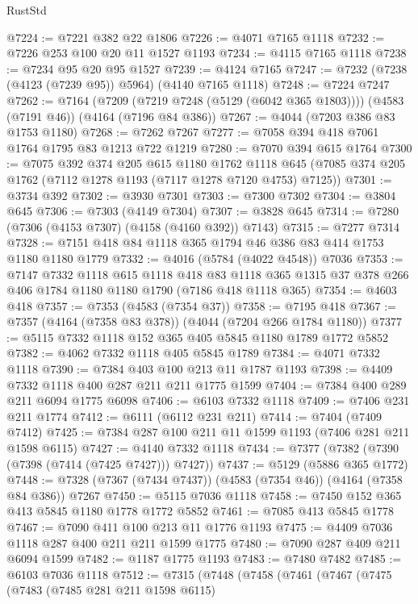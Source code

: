 \begin{lexlean}{RustStd}
\begin{coremodule}
@7224 := @7221 @382 @22 @1806
@7226 := @4071 @7165 @1118
@7232 := @7226 @253 @100 @20 @11 @1527 @1193
@7234 := @4115 @7165 @1118
@7238 := @7234 @95 @20 @95 @1527
@7239 := @4124 @7165
@7247 := @7232 (@7238 (@4123 (@7239 @95)) @5964) (@4140 @7165 @1118)
@7248 := @7224 @7247
@7262 := @7164
    (@7209 (@7219 @7248 (@5129 (@6042 @365 @1803))))
    (@4583 (@7191 @46))
    (@4164 (@7196 @84 @386))
@7267 := @4044 (@7203 @386 @83 @1753 @1180)
@7268 := @7262 @7267
@7277 := @7058 @394 @418 @7061 @1764 @1795 @83 @1213 @722 @1219
@7280 := @7070 @394 @615 @1764
@7300 := @7075
    @392
    @374
    @205
    @615
    @1180
    @1762
    @1118
    @645
    (@7085 @374 @205 @1762 (@7112 @1278 @1193 (@7117 @1278 @7120 @4753) @7125))
@7301 := @3734 @392
@7302 := @3930 @7301
@7303 := @7300 @7302
@7304 := @3804 @645
@7306 := @7303 (@4149 @7304)
@7307 := @3828 @645
@7314 := @7280 (@7306 (@4153 @7307) (@4158 (@4160 @392)) @7143)
@7315 := @7277 @7314
@7328 := @7151 @418 @84 @1118 @365 @1794 @46 @386 @83 @414 @1753 @1180 @1180 @1779
@7332 := @4016 (@5784 (@4022 @4548)) @7036
@7353 := @7147
    @7332
    @1118
    @615
    @1118
    @418
    @83
    @1118
    @365
    @1315
    @37
    @378
    @266
    @406
    @1784
    @1180
    @1180
    @1790
    (@7186 @418 @1118 @365)
@7354 := @4603 @418
@7357 := @7353 (@4583 (@7354 @37))
@7358 := @7195 @418
@7367 := @7357 (@4164 (@7358 @83 @378)) (@4044 (@7204 @266 @1784 @1180))
@7377 := @5115 @7332 @1118 @152 @365 @405 @5845 @1180 @1789 @1772 @5852
@7382 := @4062 @7332 @1118 @405 @5845 @1789
@7384 := @4071 @7332 @1118
@7390 := @7384 @403 @100 @213 @11 @1787 @1193
@7398 := @4409 @7332 @1118 @400 @287 @211 @211 @1775 @1599
@7404 := @7384 @400 @289 @211 @6094 @1775 @6098
@7406 := @6103 @7332 @1118
@7409 := @7406 @231 @211 @1774
@7412 := @6111 (@6112 @231 @211)
@7414 := @7404 (@7409 @7412)
@7425 := @7384 @287 @100 @211 @11 @1599 @1193 (@7406 @281 @211 @1598 @6115)
@7427 := @4140 @7332 @1118
@7434 := @7377 (@7382 (@7390 (@7398 (@7414 (@7425 @7427))) @7427))
@7437 := @5129 (@5886 @365 @1772)
@7448 := @7328 (@7367 (@7434 @7437)) (@4583 (@7354 @46)) (@4164 (@7358 @84 @386)) @7267
@7450 := @5115 @7036 @1118
@7458 := @7450 @152 @365 @413 @5845 @1180 @1778 @1772 @5852
@7461 := @7085 @413 @5845 @1778
@7467 := @7090 @411 @100 @213 @11 @1776 @1193
@7475 := @4409 @7036 @1118 @287 @400 @211 @211 @1599 @1775
@7480 := @7090 @287 @409 @211 @6094 @1599
@7482 := @1187 @1775 @1193
@7483 := @7480 @7482
@7485 := @6103 @7036 @1118
@7512 := @7315
    (@7448
      (@7458
        (@7461
          (@7467
            (@7475
              (@7483
                (@7485 @281 @211 @1598 @6115)

\end{coremodule}
\end{lexlean}
